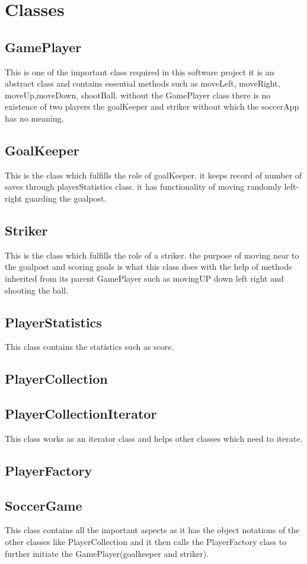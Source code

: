 \documentclass[12pt, dvipsnames, a4paper]{article}
\begin{document}
\section{Classes}
\subsection{GamePlayer}
This is one of the important class required in this software project it is an abstract class
and contains  essential methods such as moveLeft, moveRight, moveUp,moveDown, shootBall. without the GamePlayer
class there is no existence of two players the goalKeeper and striker without which the soccerApp has no meaning.
\subsection{GoalKeeper}
This is the class which fulfills the role of goalKeeper. it keeps record of number of saves through
playerStatistics class. it has functionality of moving randomly left-right guarding the goalpost.
\subsection{Striker}
This is the class which fulfills the role of a striker. the purpose of moving near to the goalpost
and scoring goals is what this class does with the help of methods inherited from its parent GamePlayer such as
movingUP down left right and shooting the ball.
\subsection{PlayerStatistics}
This class contains the statistics such as score.
\subsection{PlayerCollection}
\subsection{PlayerCollectionIterator}
This class works as an iterator class and helps other classes which need to iterate.
\subsection{PlayerFactory}
\subsection{SoccerGame}
This class contains all the important aspects as it has the object notations of the other classes like PlayerCollection and it then
calls the PlayerFactory class to further initiate the GamePlayer(goalkeeper and striker).
\end{document}
